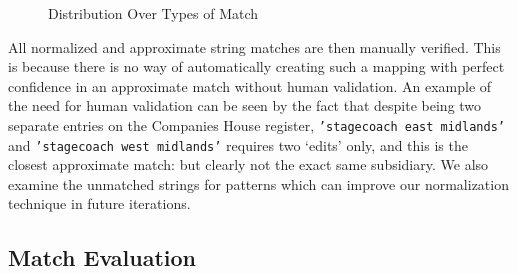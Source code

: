 \documentclass[12pt]{article}
\begin{document}
\begin{figure}[!t]
\caption{Distribution Over Types of Match}\label{distributionofmatches}
\end{figure}

All normalized and approximate string matches are then manually verified. This is because there is no way of automatically creating such a mapping with perfect confidence in an approximate match without human validation. An example of the need for human validation can be seen by the fact that despite being two separate entries on the Companies House register, \texttt{'stagecoach east midlands'} and \texttt{'stagecoach west midlands'} requires two `edits' only, and this is the closest approximate match: but clearly not the exact same subsidiary. We also examine the unmatched strings for patterns which can improve our normalization technique in future iterations.

\subsection{Match Evaluation}
\end{document}
